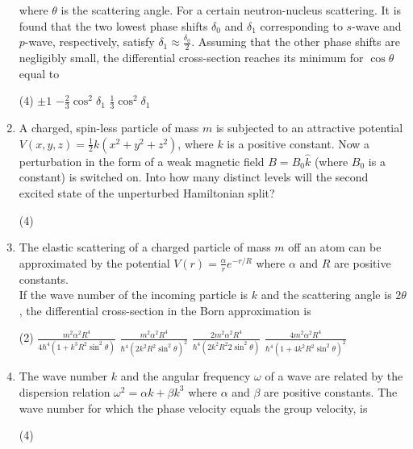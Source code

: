 \begin{enumerate}
$$$$
where $\theta$ is the scattering angle. For a certain neutron-nucleus scattering. It is found that the two lowest phase shifts $\delta_{0}$ and $\delta_{1}$ corresponding to $s$-wave and $p$-wave, respectively, satisfy $\delta_{1} \approx \frac{\delta_{0}}{2}$. Assuming that the other phase shifts are negligibly small, the differential cross-section reaches its minimum for $\cos \theta$ equal to
 \begin{tasks}(4)
	\task[\textbf{b.}] $\pm 1$
	\task[\textbf{c.}]$-\frac{2}{3} \cos ^{2} \delta_{1}$
	\task[\textbf{d.}]  $\frac{1}{3} \cos ^{2} \delta_{1}$
\end{tasks}
\item A charged, spin-less particle of mass $m$ is subjected to an attractive potential $V(x, y, z)=\frac{1}{2} k\left(x^{2}+y^{2}+z^{2}\right)$, where $k$ is a positive constant. Now a perturbation in the form of a weak magnetic field $B=B_{0} \hat{k}$ (where $B_{0}$ is a constant) is switched on. Into how many distinct levels will the second excited state of the unperturbed Hamiltonian split?
 \begin{tasks}(4)
\end{tasks}
\item  The elastic scattering of a charged particle of mass $m$ off an atom can be approximated by the potential $V(r)=\frac{\alpha}{r} e^{-r / R}$ where $\alpha$ and $R$ are positive constants.\\
If the wave number of the incoming particle is $k$ and the scattering angle is $2 \theta$, the differential cross-section in the Born approximation is
 \begin{tasks}(2)
	\task[\textbf{a.}]$\frac{m^{2} \alpha^{2} R^{4}}{4 \hbar^{4}\left(1+k^{3} R^{2} \sin ^{2} \theta\right)}$
	\task[\textbf{b.}]$\frac{m^{2} \alpha^{2} R^{4}}{\hbar^{4}\left(2 k^{2} R^{2} \sin ^{2} \theta\right)^{2}}$
	\task[\textbf{c.}] $\frac{2 m^{2} \alpha^{2} R^{4}}{\hbar^{4}\left(2 k^{2} R^{2} 2 \sin ^{2} \theta\right)}$
	\task[\textbf{d.}] $\frac{4 m^{2} \alpha^{2} R^{4}}{\hbar^{4}\left(1+4 k^{2} R^{2} \sin ^{2} \theta\right)^{2}}$
\end{tasks}
\item  The wave number $k$ and the angular frequency $\omega$ of a wave are related by the dispersion relation $\omega^{2}=\alpha k+\beta k^{3}$ where $\alpha$ and $\beta$ are positive constants. The wave number for which the phase velocity equals the group velocity, is
 \begin{tasks}(4)

\end{tasks}
\end{enumerate}
